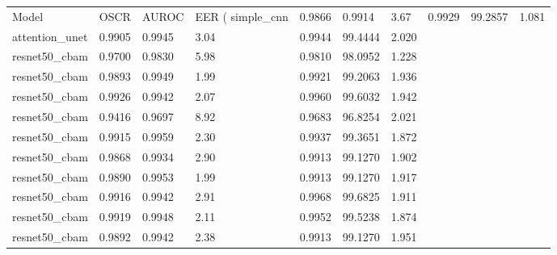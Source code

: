 \begin{tabular}{lllllll}
\toprule
Model & OSCR & AUROC & EER (%
\midrule
simple_cnn & 0.9866 & 0.9914 & 3.67 & 0.9929 & 99.2857 & 1.081 \\
attention_unet & 0.9905 & 0.9945 & 3.04 & 0.9944 & 99.4444 & 2.020 \\
resnet50_cbam & 0.9700 & 0.9830 & 5.98 & 0.9810 & 98.0952 & 1.228 \\
resnet50_cbam & 0.9893 & 0.9949 & 1.99 & 0.9921 & 99.2063 & 1.936 \\
resnet50_cbam & 0.9926 & 0.9942 & 2.07 & 0.9960 & 99.6032 & 1.942 \\
resnet50_cbam & 0.9416 & 0.9697 & 8.92 & 0.9683 & 96.8254 & 2.021 \\
resnet50_cbam & 0.9915 & 0.9959 & 2.30 & 0.9937 & 99.3651 & 1.872 \\
resnet50_cbam & 0.9868 & 0.9934 & 2.90 & 0.9913 & 99.1270 & 1.902 \\
resnet50_cbam & 0.9890 & 0.9953 & 1.99 & 0.9913 & 99.1270 & 1.917 \\
resnet50_cbam & 0.9916 & 0.9942 & 2.91 & 0.9968 & 99.6825 & 1.911 \\
resnet50_cbam & 0.9919 & 0.9948 & 2.11 & 0.9952 & 99.5238 & 1.874 \\
resnet50_cbam & 0.9892 & 0.9942 & 2.38 & 0.9913 & 99.1270 & 1.951 \\
\bottomrule
\end{tabular}
